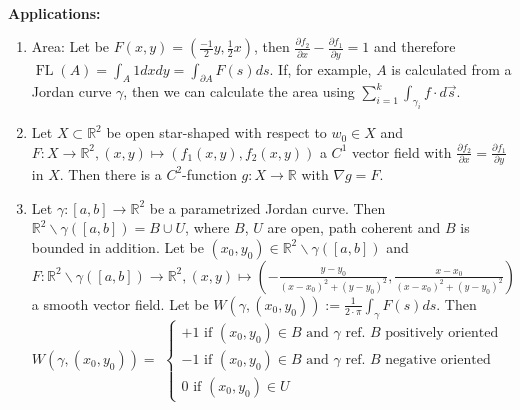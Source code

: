 \documentclass[10pt,landscape]{article}
\begin{document}
\begin{multicols}{3}
$$$$\\
\textbf{Applications:}
\begin{enumerate}
        \item Area: Let be $F(x,y) = (\frac{-1}{2}y, \frac{1}{2}x)$, then $\frac{\partial f_2}{\partial x} - \frac{\partial f_1}{\partial y} = 1$ and therefore
        $\operatorname{FL}(A) = \int_{A} 1 d x d y = \int_{\partial A}F(s)ds$. If, for example, $A$ is calculated from a Jordan curve $\gamma$, then we can calculate the area using 
        $\sum_{i=1}^{k} \int_{\gamma_{i}} f \cdot d \vec{s}$.
        \item Let $X \subset \mathbb{R}^2$ be open star-shaped with respect to $w_0 \in X$ and $F: X \rightarrow \mathbb{R}^2, (x,y) \mapsto (f_1(x,y), f_2(x,y))$ a $C^{1}$ vector field
        with $\frac{\partial f_2}{\partial x} = \frac{\partial f_1}{\partial y}$ in $X$. Then there is a $C^2$-function $g: X \rightarrow \mathbb{R}$ with $\nabla g = F$.
        \item Let $\gamma: [a,b] \rightarrow \mathbb{R}^2$ be a parametrized Jordan curve. Then $\mathbb{R}^2 \backslash \gamma([a,b]) = B \cup U$, where $B$, $U$ are open, path coherent 
        and $B$ is bounded in addition. Let be $(x_0, y_0) \in \mathbb{R}^2 \backslash \gamma([a,b])$ and $F: \mathbb{R}^2 \backslash \gamma([a,b]) \rightarrow 
        \mathbb{R}^2, (x,y) \mapsto (- \frac{y - y_0}{(x-x_0)^2 + (y-y_0)^2 }, \frac{x - x_0}{(x-x_0)^2 + (y-y_0)^2 })$
        a smooth vector field. Let be $W(\gamma, (x_0, y_0)) := \frac{1}{2 \cdot \pi} \int_{\gamma}F(s)ds$. Then $W(\gamma, (x_0, y_0))= $
        $
        \left\{\begin{array}{l}
              +1 \text{ if } (x_0, y_0) \in B \text{ and } \gamma \text{ ref. } B \text{  positively oriented }\\
              -1 \text{ if } (x_0, y_0) \in B \text{ and } \gamma \text{ ref. } B \text{  negative oriented }\\
               0 \text{ if } (x_0, y_0) \in U
        \end{array}\right.
        $
\end{enumerate}
\newpage
\end{multicols}
\end{document}
